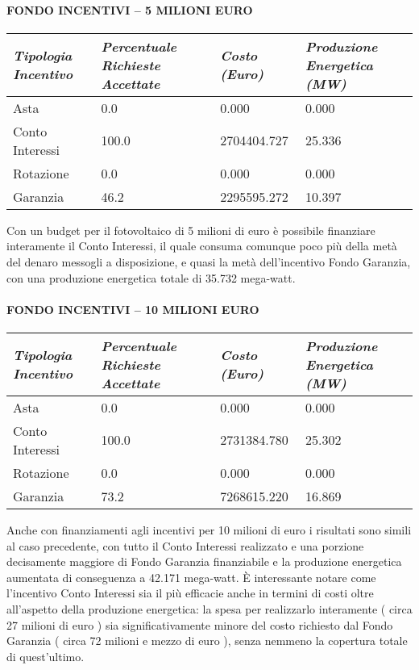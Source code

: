 \documentclass[12pt,a4paper,openright,twoside]{report}
\begin{document}
\paragraph{FONDO INCENTIVI – 5 MILIONI EURO}
\begin{center}
	\begin{tabular}{ | p{3.5cm} | p{3.5cm} | p{3.5cm} | p{3.5cm} | }
		\hline
		\nohyphens{\emph{Tipologia Incentivo}} & \nohyphens{\emph{Percentuale Richieste Accettate}} & \nohyphens{\emph{Costo (Euro)}} & \nohyphens{\emph{Produzione Energetica (MW)}} \\ \hline
		Asta & 0.0 & 0.000 & 0.000 \\ \hline
		Conto Interessi & 100.0 & 2704404.727 & 25.336 \\ \hline
		Rotazione & 0.0 & 0.000 & 0.000 \\ \hline
		Garanzia & 46.2 & 2295595.272 & 10.397 \\
		\hline
	\end{tabular}
\end{center}
Con un budget per il fotovoltaico di 5 milioni di euro è possibile finanziare interamente il Conto Interessi, il quale consuma comunque poco più della metà del denaro messogli a disposizione, e quasi la metà dell'incentivo Fondo Garanzia, con una produzione energetica totale di 35.732 mega-watt.
\paragraph{FONDO INCENTIVI – 10 MILIONI EURO}
\begin{center}
	\begin{tabular}{ | p{3.5cm} | p{3.5cm} | p{3.5cm} | p{3.5cm} | }
		\hline
		\nohyphens{\emph{Tipologia Incentivo}} & \nohyphens{\emph{Percentuale Richieste Accettate}} & \nohyphens{\emph{Costo (Euro)}} & \nohyphens{\emph{Produzione Energetica (MW)}} \\ \hline
		Asta & 0.0 & 0.000 & 0.000 \\ \hline
		Conto Interessi & 100.0 & 2731384.780 & 25.302 \\ \hline
		Rotazione & 0.0 & 0.000 & 0.000 \\ \hline
		Garanzia & 73.2 & 7268615.220 & 16.869 \\
		\hline
	\end{tabular}
\end{center}
Anche con finanziamenti agli incentivi per 10 milioni di euro i risultati sono simili al caso precedente, con tutto il Conto Interessi realizzato e una porzione decisamente maggiore di Fondo Garanzia finanziabile e la produzione energetica aumentata di conseguenza a 42.171 mega-watt.
È interessante notare come l'incentivo Conto Interessi sia il più efficacie anche in termini di costi oltre all'aspetto della produzione energetica: la spesa per realizzarlo interamente ( circa 27 milioni di euro ) sia significativamente minore del costo richiesto dal Fondo Garanzia ( circa 72 milioni e mezzo di euro ), senza nemmeno la copertura totale di quest'ultimo.
\end{document}
